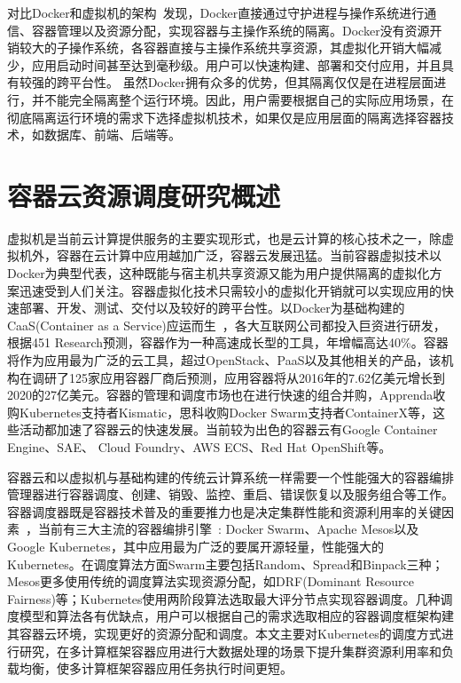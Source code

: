 对比Docker和虚拟机的架构~\cite{Barik2017Performance, Felter2007An}发现，Docker直接通过守护进程与操作系统进行通信、容器管理以及资源分配，实现容器与主操作系统的隔离。Docker没有资源开销较大的子操作系统，各容器直接与主操作系统共享资源，其虚拟化开销大幅减少，应用启动时间甚至达到毫秒级。用户可以快速构建、部署和交付应用，并且具有较强的跨平台性。
虽然Docker拥有众多的优势，但其隔离仅仅是在进程层面进行，并不能完全隔离整个运行环境。因此，用户需要根据自己的实际应用场景，在彻底隔离运行环境的需求下选择虚拟机技术，如果仅是应用层面的隔离选择容器技术，如数据库、前端、后端等。

\section{容器云资源调度研究概述}
虚拟机是当前云计算提供服务的主要实现形式，也是云计算的核心技术之一，除虚拟机外，容器在云计算中应用越加广泛，容器云发展迅猛。当前容器虚拟技术以Docker为典型代表，这种既能与宿主机共享资源又能为用户提供隔离的虚拟化方案迅速受到人们关注。容器虚拟化技术只需较小的虚拟化开销就可以实现应用的快速部署、开发、测试、交付以及较好的跨平台性。以Docker为基础构建的CaaS(Container as a Service)应运而生~\cite{Kozhirbayev2017A}，各大互联网公司都投入巨资进行研发，根据451 Research预测，容器作为一种高速成长型的工具，年增幅高达40\%。容器将作为应用最为广泛的云工具，超过OpenStack、PaaS以及其他相关的产品，该机构在调研了125家应用容器厂商后预测，应用容器将从2016年的7.62亿美元增长到2020的27亿美元。容器的管理和调度市场也在进行快速的组合并购，Apprenda收购Kubernetes支持者Kismatic，思科收购Docker Swarm支持者ContainerX等，这些活动都加速了容器云的快速发展。当前较为出色的容器云有Google Container Engine、SAE、 Cloud Foundry、AWS ECS、Red Hat OpenShift等。

容器云和以虚拟机与基础构建的传统云计算系统一样需要一个性能强大的容器编排管理器进行容器调度、创建、销毁、监控、重启、错误恢复以及服务组合等工作。容器调度器既是容器技术普及的重要推力也是决定集群性能和资源利用率的关键因素~\cite{Application2017}，当前有三大主流的容器编排引擎~\cite{Usman2016}: Docker Swarm、Apache Mesos以及Google Kubernetes，其中应用最为广泛的要属开源轻量，性能强大的Kubernetes。在调度算法方面Swarm主要包括Random、Spread和Binpack三种；Mesos更多使用传统的调度算法实现资源分配，如DRF(Dominant Resource Fairness)等；Kubernetes使用两阶段算法选取最大评分节点实现容器调度。几种调度模型和算法各有优缺点，用户可以根据自己的需求选取相应的容器调度框架构建其容器云环境，实现更好的资源分配和调度。本文主要对Kubernetes的调度方式进行研究，在多计算框架容器应用进行大数据处理的场景下提升集群资源利用率和负载均衡，使多计算框架容器应用任务执行时间更短。

